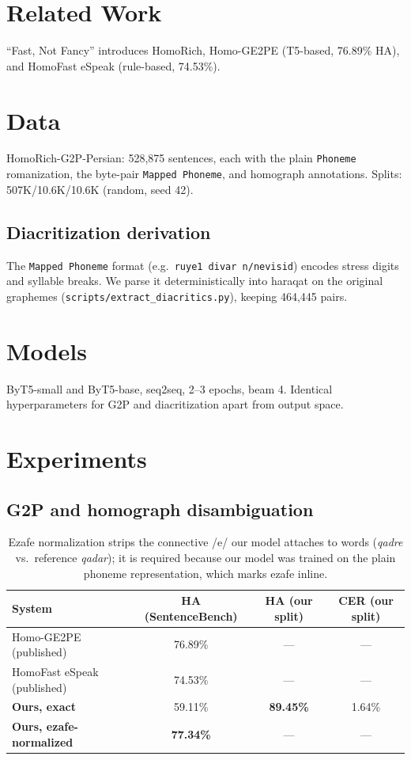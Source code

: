\documentclass[11pt]{article}
\begin{document}
\section{Related Work}
``Fast, Not Fancy'' \cite{homorich} introduces HomoRich, Homo-GE2PE
(T5-based, 76.89\% HA), and HomoFast eSpeak (rule-based, 74.53\%).

\section{Data}
HomoRich-G2P-Persian: 528,875 sentences, each with the plain
\texttt{Phoneme} romanization, the byte-pair \texttt{Mapped Phoneme},
and homograph annotations. Splits: 507K/10.6K/10.6K (random, seed 42).

\subsection{Diacritization derivation}
The \texttt{Mapped Phoneme} format (e.g.\ \texttt{ruye1 divar
n/nevisid}) encodes stress digits and syllable breaks. We parse it
deterministically into haraqat on the original graphemes
(\texttt{scripts/extract\_diacritics.py}), keeping 464,445 pairs.

\section{Models}
ByT5-small and ByT5-base, seq2seq, 2--3 epochs, beam 4. Identical
hyperparameters for G2P and diacritization apart from output space.

\section{Experiments}
\subsection{G2P and homograph disambiguation}
\begin{table}[h]
\centering
\begin{tabular}{lccc}
\toprule
System & HA (SentenceBench) & HA (our split) & CER (our split) \\
\midrule
Homo-GE2PE (published) & 76.89\% & --- & --- \\
HomoFast eSpeak (published) & 74.53\% & --- & --- \\
\textbf{Ours, exact} & 59.11\% & \textbf{89.45\%} & 1.64\% \\
\textbf{Ours, ezafe-normalized} & \textbf{77.34\%} & --- & --- \\
\bottomrule
\end{tabular}
\caption{Ezafe normalization strips the connective /e/ our model attaches
to words (\emph{qadre} vs.\ reference \emph{qadar}); it is required
because our model was trained on the plain phoneme representation, which
marks ezafe inline.}
\end{table}
\end{document}
